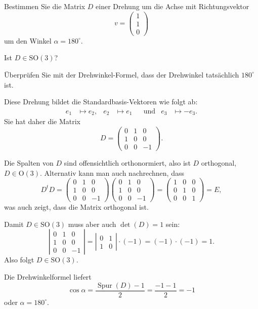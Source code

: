 Bestimmen Sie die Matrix $D$ einer Drehung um die Achse mit Richtungsvektor
\[
v=\begin{pmatrix}1\\1\\0\end{pmatrix}
\]
um den Winkel $\alpha=180^\circ$.
\begin{teilaufgaben}
\item Ist $D\in\text{SO}(3)$?
\item Überprüfen Sie mit der Drehwinkel-Formel, dass der Drehwinkel
tatsächlich $180^\circ$ ist.
\end{teilaufgaben}


\begin{loesung}
Diese Drehung bildet die Standardbasis-Vektoren wie folgt ab:
\[
\begin{aligned}
e_1&\mapsto e_2,
&
e_2&\mapsto e_1
&&\text{und}
&
e_3&\mapsto -e_3.
\end{aligned}
\]
Sie hat daher die Matrix
\[
D
=
\begin{pmatrix}
0&1& 0\\
1&0& 0\\
0&0&-1
\end{pmatrix}.
\]
\begin{teilaufgaben}
\item Die Spalten von $D$ sind offensichtlich orthonormiert, also ist $D$
orthogonal, $D\in\textrm{O}(3)$.
Alternativ kann man auch nachrechnen, dass
\[
D^tD
=
\begin{pmatrix}
0&1& 0\\
1&0& 0\\
0&0&-1
\end{pmatrix}
\begin{pmatrix}
0&1& 0\\
1&0& 0\\
0&0&-1
\end{pmatrix}
=
\begin{pmatrix}
1&0&0\\
0&1&0\\
0&0&1
\end{pmatrix}
=E,
\]
was auch zeigt, dass die Matrix orthogonal ist.

Damit $D\in\textrm{SO}(3)$ muss aber auch $\det(D)=1$ sein:
\[
\left|
\begin{matrix}
0&1& 0\\
1&0& 0\\
0&0&-1
\end{matrix}\right|
=
\left|\begin{matrix}0&1\\1&0\end{matrix}\right|\cdot (-1)
=(-1)\cdot(-1)=1.
\]
Also folgt $D\in\textrm{SO}(3)$.
\item
Die Drehwinkelformel liefert
\[
\cos\alpha = \frac{\operatorname{Spur}(D)-1}2=\frac{-1-1}2=-1
\]
oder $\alpha=180^\circ$.
\qedhere
\end{teilaufgaben}
\end{loesung}

